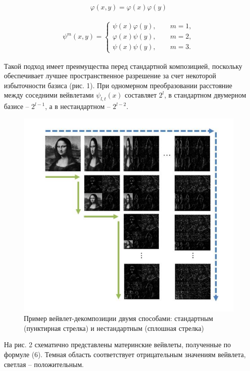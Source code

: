 \documentclass[a4paper, 12pt]{article}		%
\begin{document}
\begin{gather}
\varphi(x,y)=\varphi(x)\varphi(y)
\end{gather}

\begin{gather}
\psi^m(x,y) =
  \begin{cases}
    \psi(x)\varphi(y),\qquad m=1,\\
    \varphi(x)\psi(y),\qquad m=2,\\
    \psi(x)\psi(y),\qquad m=3.
 \end{cases}
\end{gather}

Такой подход имеет преимущества перед стандартной композицией, поскольку обеспечивает лучшее пространственное разрешение за счет некоторой избыточности базиса (рис. 1). При одномерном преобразовании расстояние между соседними вейвлетами $\psi_{l,t}(x)$ составляет $2^l$, в стандартном двумерном базисе -- $2^{l-1}$, а в нестандартном -- $2^{l-2}$.

\begin{figure}[h!]
\centering
\includegraphics[scale=0.6]{res/pic001}
\caption{Пример вейвлет-декомпозиции двумя способами: стандартным (пунктирная стрелка) и нестандартным (сплошная стрелка)}
\end{figure}

На рис. 2 схематично представлены материнские вейвлеты, полученные по формуле (6). Темная область соответствует отрицательным значениям вейвлета, светлая -- положительным.
\end{document}
